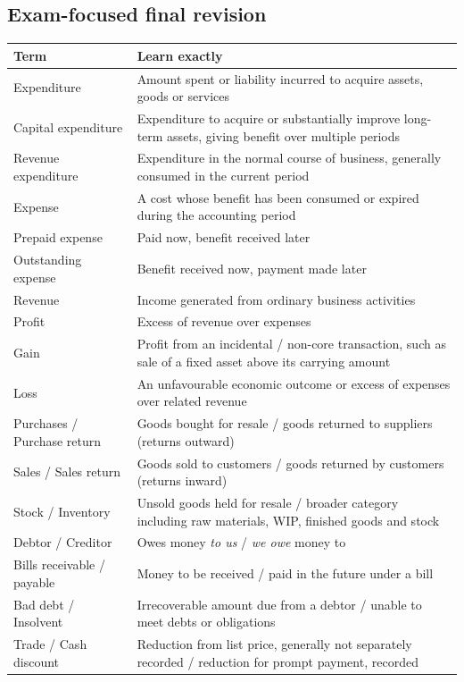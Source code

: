 \documentclass[11pt,a4paper]{article}
\begin{document}
\subsection{Exam-focused final revision}

\begin{center}
\small
\begin{tabularx}{\textwidth}{@{}l Y@{}}
\toprule
{}\textbf{Term} & \textbf{Learn exactly}\\
\midrule
Expenditure & Amount spent or liability incurred to acquire assets, goods or services\\
Capital expenditure & Expenditure to acquire or substantially improve long-term assets, giving benefit over multiple periods\\
Revenue expenditure & Expenditure in the normal course of business, generally consumed in the current period\\
Expense & A cost whose benefit has been consumed or expired during the accounting period\\
Prepaid expense & Paid now, benefit received later\\
Outstanding expense & Benefit received now, payment made later\\
Revenue & Income generated from ordinary business activities\\
Profit & Excess of revenue over expenses\\
Gain & Profit from an incidental / non-core transaction, such as sale of a fixed asset above its carrying amount\\
Loss & An unfavourable economic outcome or excess of expenses over related revenue\\
Purchases / Purchase return & Goods bought for resale / goods returned to suppliers (returns outward)\\
Sales / Sales return & Goods sold to customers / goods returned by customers (returns inward)\\
Stock / Inventory & Unsold goods held for resale / broader category including raw materials, WIP, finished goods and stock\\
Debtor / Creditor & Owes money \emph{to us} / \emph{we owe} money to\\
Bills receivable / payable & Money to be received / paid in the future under a bill\\
Bad debt / Insolvent & Irrecoverable amount due from a debtor / unable to meet debts or obligations\\
Trade / Cash discount & Reduction from list price, generally not separately recorded / reduction for prompt payment, recorded\\
\bottomrule
\end{tabularx}
\end{center}
\end{document}
